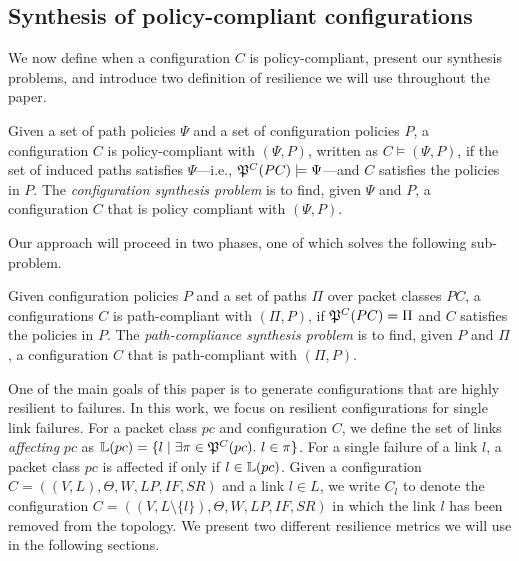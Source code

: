 \subsection{Synthesis of policy-compliant configurations}
We now define when a configuration $C$ is policy-compliant, present our synthesis problems, and introduce two definition of resilience we will use throughout the paper.
\begin{definition} \label{def:policycompliance}
	Given a set of path policies $\Psi$ and a set of configuration policies $P$,
	a configuration $C$ is policy-compliant with $(\Psi,P)$,  
	written as $C \models (\Psi,P)$, if the set of
	induced paths satisfies $\Psi$---i.e., $\mathfrak{P}^C(PC) \models \Psi$---and $C$ satisfies the policies in $P$.
	The \emph{configuration synthesis problem} is to find, given $\Psi$ and $P$,
a configuration $C$ that is policy compliant with $(\Psi,P)$.
\end{definition}

Our approach will proceed in two phases,
one of which solves the following sub-problem.  
\begin{definition} \label{def:pathcompliance}
Given configuration policies $P$
and a set of paths $\Pi$ over packet classes $PC$,
	a configurations $C$ is path-compliant with 
	$(\Pi,P)$,
	if $\mathfrak{P}^C(PC)=\Pi$ and $C$ satisfies the policies in $P$.
	The \emph{path-compliance synthesis problem} is to find, given $P$ and $\Pi$,
a configuration $C$ that is path-compliant with $(\Pi,P)$.
\end{definition}

One of the main goals of this paper is to 
generate configurations that are highly resilient to failures. In this
work, we focus on resilient configurations for single link failures. 
For a packet class $pc$ and configuration $C$, we define 
the set of links \emph{affecting} $pc$ as 
$\mathbb{L}(pc) = \{l \mid \exists \pi \in \mathfrak{P}^C(pc).~l \in \pi  \}$.
For a single failure of a link $l$, a packet class $pc$ is affected 
if only if $l \in \mathbb{L}(pc)$. 
Given a configuration
$C=((V,L), \Theta,W,LP,IF,SR)$ and a link $l\in L$,
we write $C_l$ 
to denote the configuration
$C=((V,L\setminus\{l\}), \Theta,W,LP,IF,SR)$
in which the link $l$ has been removed from the topology.
We present two different resilience metrics 
we will use in the following sections. 

